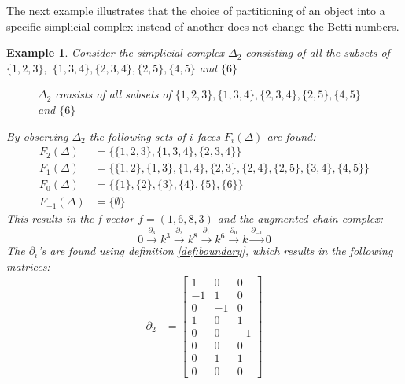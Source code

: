 \documentclass[11pt,a4paper,twoside]{report}
\newtheorem{myex}[mythm]{Example}
\begin{document}
The next example illustrates that the choice of partitioning of an object into a specific simplicial complex instead of another does not change the Betti numbers.
\begin{myex}
Consider the simplicial complex $\Delta_2$ consisting of all the subsets of $\{1,2,3\},$ $\{1,3,4\},\{2,3,4\},\{2,5\},\{4,5\}$ and $\{6\}$
\begin{figure}[H]
\center
{}
\caption{$\Delta_2$ consists of all subsets of $\{1,2,3\},\{1,3,4\},\{2,3,4\},\{2,5\},\{4,5\}$ and $\{6\}$}
\label{fig:ex2}
\end{figure}
By observing $\Delta_2$ the following sets of $i$-faces  $F_i(\Delta)$ are found:
\begin{align*}
F_2(\Delta) &= \{\{1,2,3\},\{1,3,4\},\{2,3,4\}\}\\
F_1(\Delta) &= \{\{1,2\},\{1,3\},\{1,4\},\{2,3\},\{2,4\},\{2,5\},\{3,4\},\{4,5\}\}\\
F_0(\Delta) &= \{\{1\},\{2\},\{3\},\{4\},\{5\},\{6\}\}\\
F_{-1}(\Delta) &= \{\emptyset\}
\end{align*}
This results in the f-vector $f=(1,6,8,3)$ and the augmented chain complex:
\begin{equation*}
0\overset{\partial_3}{\to} k^3\overset{\partial_2}{\to} k^8\overset{\partial_1}{\to} k^6\overset{\partial_0}{\to} k \overset{\partial_{-1}}{\to} 0
\end{equation*}
The $\partial_i$'s are found using definition \ref{def:boundary}, which results in the following matrices:
\begin{align*}
\partial_2&=
\begin{bmatrix}
1 & 0 & 0 \\
-1 & 1 & 0 \\
0 & -1 & 0 \\
1 & 0 & 1 \\
0 & 0 & -1 \\
0 & 0 & 0 \\
0 & 1 & 1 \\
0 & 0 & 0 
\end{bmatrix}

\end{align*}
\end{myex}
\end{document}
